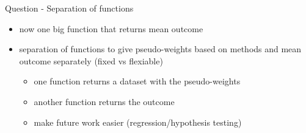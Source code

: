 \documentclass[
  ignorenonframetext,
]{beamer}
\providecommand{\tightlist}{%
  \setlength{\itemsep}{0pt}\setlength{\parskip}{0pt}}
\begin{document}
\begin{frame}{Question - Separation of functions}
\label{question---separation-of-functions}
\begin{itemize}
\item
  now one big function that returns mean outcome
\item
  separation of functions to give pseudo-weights based on methods and
  mean outcome separately (fixed vs flexiable)

  \begin{itemize}
  \tightlist
  \item
    one function returns a dataset with the pseudo-weights
  \item
    another function returns the outcome
  \item
    make future work easier (regression/hypothesis testing)
  \end{itemize}
\end{itemize}
\end{frame}
\end{document}
